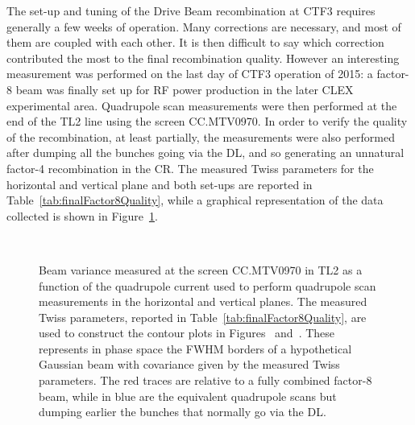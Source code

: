 The set-up and tuning of the Drive Beam recombination at CTF3 requires generally a few weeks of operation.
Many corrections are necessary, and most of them are coupled with each other.
It is then difficult to say which correction contributed the most to the final recombination quality.
However an interesting measurement was performed on the last day of CTF3 operation of 2015: a factor-8 beam
was finally set up for RF power production in the later CLEX experimental area.
Quadrupole scan measurements were then performed at the end of the TL2 line using the screen CC.MTV0970.
In order to verify the quality of the recombination, at least partially, the measurements were also performed
after dumping all the bunches going via the DL, and so generating an unnatural factor-4 recombination in the
CR.
The measured Twiss parameters for the horizontal and vertical plane and both set-ups are reported in
Table~\ref{tab:finalFactor8Quality}, while a graphical representation of the data collected is shown in
Figure~\ref{fig:finalFactor8Quality}.
%
\begin{figure}[htbp]
\centering
{}
\qquad
{}
\\
\qquad
{}
\caption{Beam variance measured at the screen CC.MTV0970 in TL2 as a function of the quadrupole current used
         to perform quadrupole scan measurements
         in the horizontal \protect{} and vertical
         \protect{} planes.
         The measured Twiss parameters, reported in Table~\ref{tab:finalFactor8Quality}, are used to
         construct the contour plots in Figures~\protect{}
         and~\protect{}.
         These represents  in phase space the FWHM borders of a hypothetical Gaussian beam with covariance
         given by the measured Twiss parameters.
         The red traces are relative to a fully combined factor-8 beam, while in blue are the equivalent
         quadrupole scans but dumping earlier the bunches that normally go via the DL.
}
\label{fig:finalFactor8Quality}
\end{figure}
